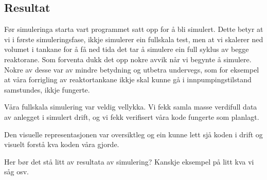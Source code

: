 \subsection{Resultat}


Før simuleringa starta vart programmet satt opp for å bli simulert. 
Dette betyr at vi i første simuleringsfase, ikkje simulerer ein fullskala test, men at vi skalerer ned volumet i tankane 
for å få ned tida det tar å simulere ein full syklus av begge reaktorane. 
Som forventa dukk det opp nokre avvik når vi begynte å simulere. 
Nokre av desse var av mindre betydning og utbetra  undervegs, som for eksempel at våra forrigling av reaktortankane ikkje skal 
kunne gå i innpumpingstilstand samstundes, ikkje fungerte.

Våra fullskala simulering var veldig vellykka. 
Vi fekk samla masse verdifull data av anlegget i simulert drift, og vi fekk verifisert våra kode fungerte som planlagt.
 
Den visuelle representasjonen var oversiktleg og ein kunne lett sjå koden i drift og visuelt forstå kva koden våra gjorde.      


Her bør det stå litt av resultata av simulering? \newline 
Kanskje eksempel på litt kva vi såg osv.\newline
